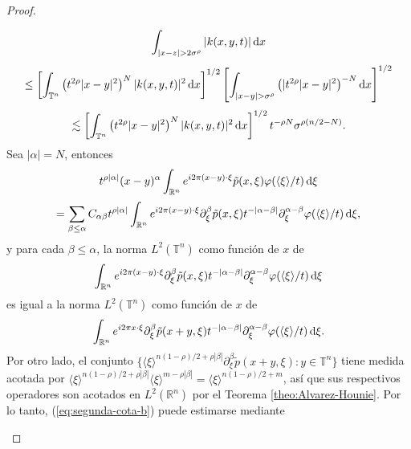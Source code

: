 \begin{proof}
\begin{itemize}
\begin{equation*}
			\int_{|x-z|>2\sigma^\rho} |k(x, y, t)| \diff x 
		\end{equation*}
		\begin{equation*}
			\leq \left[ \int_{\mathbb{T}^n} \left( t^{2\rho} |x-y|^2 \right)^N |k(x, y, t)|^2 \diff x \right]^{1/2} \left[ \int_{|x-y|>\sigma^\rho} \left(|t^{2\rho}|x-y|^2\right)^{-N}\diff x \right]^{1/2}
		\end{equation*}
		\begin{equation}
			\lesssim \left[ \int_{\mathbb{T}^n} \left( t^{2\rho}|x-y|^2 \right)^N|k(x,y,t)|^2 \mathop{}\!\mathrm{d} x \right]^{1/2}t^{-\rho N}\sigma^{\rho(n/2 - N)}.
			\label{eq:segunda-cota-b}
		\end{equation} 
		Sea $|\alpha|=N$, entonces 
		\begin{equation*}
			t^{\rho|\alpha|} (x-y)^\alpha \int_{\mathbb{R}^n} e^{i2\pi(x - y) \cdot \xi} \tilde{p}(x, \xi)\varphi(\langle\xi\rangle/t)\mathop{}\!\mathrm{d}\xi 
		\end{equation*}
		\begin{equation*}
			= \sum_{\beta\leq\alpha} C_{\alpha\beta}t^{\rho|\alpha|} \int_{\mathbb{R}^n} e^{i2\pi(x - y) \cdot \xi} \partial^\beta_\xi \tilde{p}(x, \xi)t^{-|\alpha-\beta|} \partial^{\alpha-\beta}_\xi \varphi(\langle\xi\rangle/t)\mathop{}\!\mathrm{d} \xi,
		\end{equation*}
		y para cada $\beta\leq\alpha$, la norma $L^2(\mathbb{T}^n)$ como función de $x$ de 
		\begin{equation*}
			\int_{\mathbb{R}^n} e^{i2\pi(x - y) \cdot \xi} \partial^\beta_\xi \tilde{p}(x, \xi)t^{-|\alpha-\beta|} \partial^{\alpha-\beta}_\xi \varphi(\langle\xi\rangle/t)\mathop{}\!\mathrm{d} \xi
		\end{equation*}
		es igual a la norma $L^2(\mathbb{T}^n)$ como función de $x$ de 
		\begin{equation*}
			\int_{\mathbb{R}^n} e^{i2\pi x \cdot \xi} \partial^\beta_\xi \tilde{p}(x+y, \xi)t^{-|\alpha-\beta|} \partial^{\alpha-\beta}_\xi \varphi(\langle\xi\rangle/t)\mathop{}\!\mathrm{d} \xi.
		\end{equation*}
		Por otro lado, el conjunto $\{ \langle\xi\rangle^{n(1-\rho)/2 + \rho|\beta|} \partial^\beta_\xi\tilde{p}(x + y, \xi) : y \in \mathbb{T}^n  \}$ tiene medida acotada por $\langle\xi\rangle^{n(1-\rho)/2 + \rho|\beta|} \langle\xi\rangle^{m- \rho|\beta|} = \langle\xi\rangle^{n(1-\rho)/2 +m}   $, así que sus respectivos operadores son acotados en $L^2(\mathbb{R}^n)$ por el Teorema \ref{theo:Alvarez-Hounie}. Por lo tanto, (\ref{eq:segunda-cota-b}) puede estimarse mediante  
		\begin{equation*}

\end{equation*}
\end{itemize}
\end{proof}

